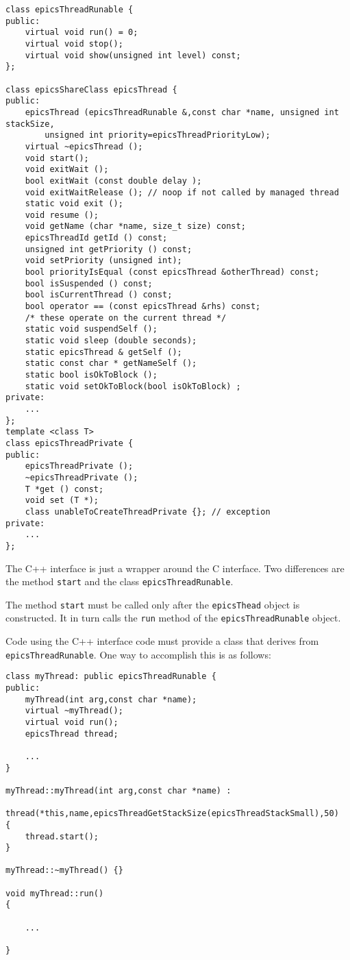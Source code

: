 \begin{verbatim}
class epicsThreadRunable {
public:
    virtual void run() = 0;
    virtual void stop();
    virtual void show(unsigned int level) const;
};

class epicsShareClass epicsThread {
public:
    epicsThread (epicsThreadRunable &,const char *name, unsigned int stackSize,
        unsigned int priority=epicsThreadPriorityLow);
    virtual ~epicsThread ();
    void start();
    void exitWait ();
    bool exitWait (const double delay );
    void exitWaitRelease (); // noop if not called by managed thread
    static void exit ();
    void resume ();
    void getName (char *name, size_t size) const;
    epicsThreadId getId () const;
    unsigned int getPriority () const;
    void setPriority (unsigned int);
    bool priorityIsEqual (const epicsThread &otherThread) const;
    bool isSuspended () const;
    bool isCurrentThread () const;
    bool operator == (const epicsThread &rhs) const;
    /* these operate on the current thread */
    static void suspendSelf ();
    static void sleep (double seconds);
    static epicsThread & getSelf ();
    static const char * getNameSelf ();
    static bool isOkToBlock ();
    static void setOkToBlock(bool isOkToBlock) ;
private:
    ...
};
template <class T>
class epicsThreadPrivate {
public:
    epicsThreadPrivate ();
    ~epicsThreadPrivate ();
    T *get () const;
    void set (T *);
    class unableToCreateThreadPrivate {}; // exception
private:
    ...
};
\end{verbatim}

The C++ interface is just a wrapper around the C interface. Two differences are the method \verb|start| and the class 
\verb|epicsThreadRunable|.

The method \verb|start| must be called only after the \verb|epicsThead| object is constructed. It in turn calls the \verb|run| method of 
the \verb|epicsThreadRunable| object.

Code using the C++ interface code must provide a class that derives from \verb|epicsThreadRunable|. One way to 
accomplish this is as follows:

\begin{verbatim}
class myThread: public epicsThreadRunable {
public:
    myThread(int arg,const char *name);
    virtual ~myThread();
    virtual void run();
    epicsThread thread;

    ...
}

myThread::myThread(int arg,const char *name) :
    thread(*this,name,epicsThreadGetStackSize(epicsThreadStackSmall),50)
{
    thread.start();
}

myThread::~myThread() {}

void myThread::run()
{

    ...

}
\end{verbatim}

